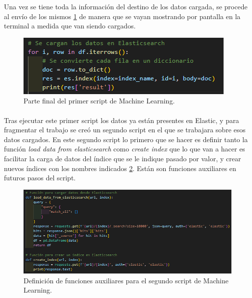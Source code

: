 Una vez se tiene toda la información del destino de los datos cargada, se procede al envío de los mismos \ref{fig:script13} de manera que se vayan mostrando por pantalla en la terminal a medida que van siendo cargados.

\begin{figure}
    \centering
    \includegraphics[width=1\linewidth]{img/iris3.png}
    \caption{Parte final del primer script de Machine Learning.}
    \label{fig:script13}
\end{figure}

\paragraph{}
\paragraph{}
\paragraph{}
\paragraph{}


Tras ejecutar este primer script los datos ya están presentes en Elastic, y para fragmentar el trabajo se creó un segundo script en el que se trabajara sobre esos datos cargados. En este segundo script lo primero que se hacer es definir tanto la función \textit{load data from elasticsearch} como \textit{create index} que lo que van a hacer es facilitar la carga de datos del índice que se le indique pasado por valor, y crear nuevos índices con los nombres indicados \ref{fig:script21}. Están son funciones auxiliares en futuros pasos del script.


\begin{figure}
    \centering
    \includegraphics[width=1\linewidth]{img/iris4.png}
    \caption{Definición de funciones auxiliares para el segundo script de Machine Learning.}
    \label{fig:script21}
\end{figure}

